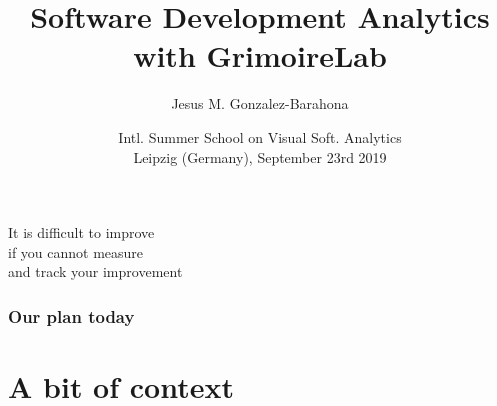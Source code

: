 \documentclass[17pt,aspectratio=169,hyperref=pdfusetitle]{beamer}
\begin{document}
\title[Analytics with GrimoireLab]{Software Development Analytics with GrimoireLab}
\author[Jesus M. Gonzalez-Barahona]{Jesus M. Gonzalez-Barahona}

\date[Visual Software Analytics]{Intl. Summer School on Visual Soft. Analytics \\ Leipzig (Germany), September 23rd 2019}

\begin{frame}
  \maketitle
\end{frame}

\begin{frame}

  {\em
    \begin{center}
      It is difficult to improve \\
      if you cannot measure \\
      and track your improvement \\
    \end{center}
  }
\end{frame}


\begin{frame}
\frametitle{Our plan today}

{\footnotesize
\tableofcontents
}
\end{frame}

\section{A bit of context}

\end{document}

